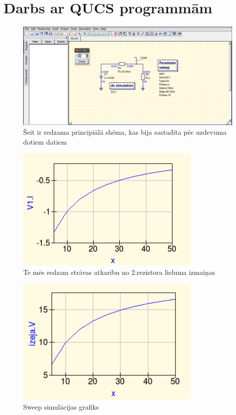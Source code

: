 \documentclass{report}
\begin{document}
\section{Darbs ar QUCS programmām}
\begin{figure}[!h]
\centering
\includegraphics[width=14cm]{qucs_circuit.png}
\caption{Šeit ir redzama principiālā shēma, kas bija sastadīta pēc uzdevuma dotiem datiem}
\end{figure}
\label{rer}

\begin{figure}[!h]
\centering
\includegraphics[width=9cm]{DC.png}
\caption{Te mēs redzam strāvas atkarību no 2.rezistora lieluma izmaiņas}
\end{figure}

\begin{figure}[!h]
\centering
\includegraphics[width=9cm]{Voltage.png}
\caption{Sweep simulācijas grafiks}
\end{figure}
\end{document}
